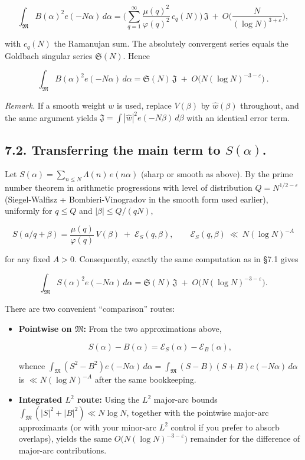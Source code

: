 \documentclass[11pt]{article}
\theoremstyle{definition}
\theoremstyle{remark}
\begin{document}
$$
	\int_{\mathfrak M} B(\alpha)^2 e(-N\alpha)\,d\alpha
	= \Big(\sum_{q=1}^{\infty}\frac{\mu(q)^2}{\varphi(q)^2}\,c_q(N)\Big)\,\mathfrak J
	\ +\ O\!\Big(\frac{N}{(\log N)^{3+\varepsilon}}\Big),
$$

with $c_q(N)$ the Ramanujan sum. The absolutely convergent series equals the Goldbach singular series $\mathfrak S(N)$. Hence

$$
	\boxed{\,\int_{\mathfrak M} B(\alpha)^2 e(-N\alpha)\,d\alpha
		=\mathfrak S(N)\,\mathfrak J\;+\;O\!\big(N(\log N)^{-3-\varepsilon}\big)\ .\ }
$$

\emph{Remark.} If a smooth weight $w$ is used, replace $V(\beta)$ by $\widehat w(\beta)$ throughout, and the same argument yields $\mathfrak J=\int|\widehat w|^2 e(-N\beta)\,d\beta$ with an identical error term.

\subsection*{7.2. Transferring the main term to $S(\alpha)$.}

Let $S(\alpha)=\sum_{n\le N}\Lambda(n)\,e(n\alpha)$ (sharp or smooth as above). By the prime number theorem in arithmetic progressions with level of distribution $Q=N^{1/2-\varepsilon}$ (Siegel-Walfisz + Bombieri-Vinogradov in the smooth form used earlier), uniformly for $q\le Q$ and $|\beta|\le Q/(qN)$,

$$
	S(a/q+\beta)=\frac{\mu(q)}{\varphi(q)}\,V(\beta) \;+\; \mathcal E_S(q,\beta),
	\qquad \mathcal E_S(q,\beta)\ \ll\ N(\log N)^{-A}
$$

for any fixed $A>0$. Consequently, exactly the same computation as in §7.1 gives

$$
	\int_{\mathfrak M} S(\alpha)^2 e(-N\alpha)\,d\alpha
	=\mathfrak S(N)\,\mathfrak J\;+\;O\!\big(N(\log N)^{-3-\varepsilon}\big).
$$

There are two convenient “comparison” routes:

\begin{itemize}
	\item \textbf{Pointwise on $\mathfrak M$:} From the two approximations above,

	      $$
		      S(\alpha)-B(\alpha)=\mathcal E_S(\alpha)-\mathcal E_B(\alpha),
	      $$

	      whence $\int_{\mathfrak M}(S^2-B^2)e(-N\alpha)\,d\alpha =\int_{\mathfrak M}(S-B)(S+B)e(-N\alpha)\,d\alpha$
	      is $\ll N(\log N)^{-A}$ after the same bookkeeping.

	\item \textbf{Integrated $L^2$ route:} Using the $L^2$ major-arc bounds $\int_{\mathfrak M}(|S|^2+|B|^2)\ll N\log N$, together with the pointwise major-arc approximants (or with your minor-arc $L^2$ control if you prefer to absorb overlaps), yields the same $O\big(N(\log N)^{-3-\varepsilon}\big)$ remainder for the difference of major-arc contributions.
\end{itemize}
\end{document}
